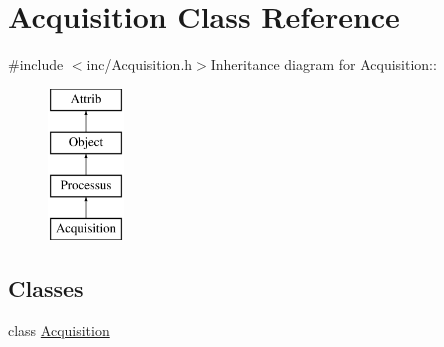 \hypertarget{classAcquisition}{
\section{Acquisition Class Reference}
\label{classAcquisition}
}


{\ttfamily \#include $<$inc/Acquisition.h$>$}Inheritance diagram for Acquisition::\begin{figure}[H]
\begin{center}
\leavevmode
\includegraphics[height=4cm]{classAcquisition}
\end{center}
\end{figure}
\subsection*{Classes}
\begin{DoxyCompactItemize}
\item 
class \hyperlink{classAcquisition_1_1Acquisition}{Acquisition}
\end{DoxyCompactItemize}
